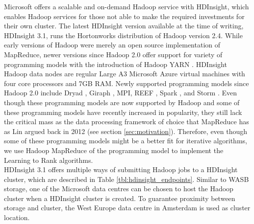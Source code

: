 Microsoft offers a scalable and on-demand Hadoop service with HDInsight, which enables Hadoop services for those not able to make the required investments for their own cluster. The latest HDInsight version available at the time of writing, HDInsight 3.1, runs the Hortonworks distribution of Hadoop version 2.4. While early versions of Hadoop were merely an open source implementation of MapReduce, newer versions since Hadoop 2.0 offer support for variety of programming models with the introduction of Hadoop YARN \cite{Vavilapalli2013}. HDInsight Hadoop data nodes are regular Large A3 Microsoft Azure virtual machines with four core processors and 7GB RAM. Newly supported programming models since Hadoop 2.0 include Dryad \cite{Isard2007}, Giraph \cite{Avery2011}, \ac{MPI}, REEF \cite{Chun2013}, Spark \cite{Zaharia2010}, and Storm \cite{Aniello2013}. Even though these programming models are now supported by Hadoop and some of these programming models have recently increased in popularity, they still lack the critical mass as the data processing framework of choice that MapReduce has as Lin argued back in 2012 \cite{Lin2013} (see section \ref{sec:motivation}). Therefore, even though some of these programming models might be a better fit for iterative algorithms, we use Hadoop MapReduce of the programming model to implement the Learning to Rank algorithms.\\

HDInsight 3.1 offers multiple ways of submitting Hadoop jobs to a HDInsight cluster, which are described in Table \ref{tbl:hdinsight_endpoints}. Similar to \ac{WASB} storage, one of the Microsoft data centres can be chosen to host the Hadoop cluster when a HDInsight cluster is created. To guarantee proximity between storage and cluster, the West Europe data centre in Amsterdam is used as cluster location.\\

